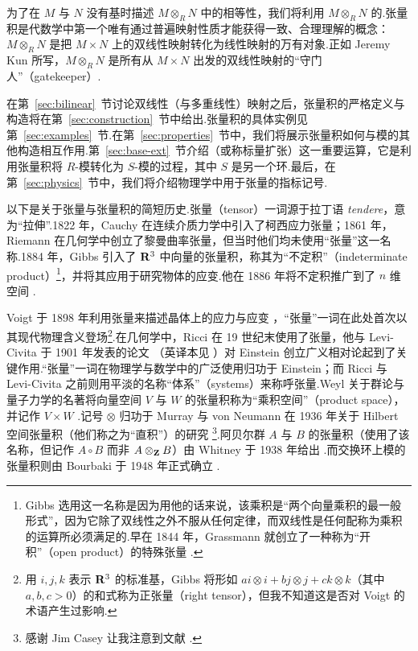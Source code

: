为了在 $M$ 与 $N$ 没有基时描述 $M \otimes_R N$ 中的相等性，我们将利用 $M \otimes_R N$ 的.张量积是代数学中第一个唯有通过普遍映射性质才能获得一致、合理理解的概念：$M \otimes_R N$ 是把 $M \times N$ 上的双线性映射转化为线性映射的万有对象.正如 Jeremy Kun \cite{kun} 所写，$M \otimes_R N$ 是所有从 $M \times N$ 出发的双线性映射的``守门人''（gatekeeper）.

在第~\ref{sec:bilinear}~节讨论双线性（与多重线性）映射之后，张量积的严格定义与构造将在第~\ref{sec:construction}~节中给出.张量积的具体实例见第~\ref{sec:examples}~节.在第~\ref{sec:properties}~节中，我们将展示张量积如何与模的其他构造相互作用.第~\ref{sec:base-ext}~节介绍（或称标量扩张）这一重要运算，它是利用张量积将 $R$-模转化为 $S$-模的过程，其中 $S$ 是另一个环.最后，在第~\ref{sec:physics}~节中，我们将介绍物理学中用于张量的指标记号.

以下是关于张量与张量积的简短历史.张量（tensor）一词源于拉丁语 \textit{tendere}，意为``拉伸''.1822 年，Cauchy 在连续介质力学中引入了柯西应力张量；1861 年，Riemann 在几何学中创立了黎曼曲率张量，但当时他们均未使用``张量''这一名称.1884 年，Gibbs \cite[第~3~章]{gibbs-vector} 引入了 $\mathbf{R}^3$ 中向量的张量积，称其为``不定积''（indeterminate product）\footnote{Gibbs 选用这一名称是因为用他的话来说，该乘积是``两个向量乘积的最一般形式''，因为它除了双线性之外不服从任何定律，而双线性是任何配称为乘积的运算所必须满足的.早在 1844 年，Grassmann 就创立了一种称为``开积''（open product）的特殊张量 \cite[第~3~章]{grassmann}.}，并将其应用于研究物体的应变.他在 1886 年将不定积推广到了 $n$ 维空间 \cite{gibbs-grassmann}.

Voigt 于 1898 年利用张量来描述晶体上的应力与应变 \cite{voigt}，``张量''一词在此处首次以其现代物理含义登场\footnote{用 $i, j, k$ 表示 $\mathbf{R}^3$ 的标准基，Gibbs 将形如 $a i \otimes i + b j \otimes j + c k \otimes k$（其中 $a, b, c > 0$）的和式称为正张量（right tensor）\cite[第~57~页]{gibbs-vector}，但我不知道这是否对 Voigt 的术语产生过影响.}.在几何学中，Ricci 在 19 世纪末使用了张量，他与 Levi-Civita 于 1901 年发表的论文 \cite{ricci-levicivita}（英译本见 \cite{ricci-english}）对 Einstein 创立广义相对论起到了关键作用.``张量''一词在物理学与数学中的广泛使用归功于 Einstein；而 Ricci 与 Levi-Civita 之前则用平淡的名称``体系''（systems）来称呼张量.Weyl 关于群论与量子力学的名著将向量空间 $V$ 与 $W$ 的张量积称为``乘积空间''（product space），并记作 $V \times W$ \cite[第~II~章第~10~节]{weyl-groups}.记号 $\otimes$ 归功于 Murray 与 von Neumann 在 1936 年关于 Hilbert 空间张量积（他们称之为``直积''）的研究 \cite[第~II~章]{murray-vonneumann}\footnote{感谢 Jim Casey 让我注意到文献 \cite{murray-vonneumann}.}.阿贝尔群 $A$ 与 $B$ 的张量积（使用了该名称，但记作 $A \circ B$ 而非 $A \otimes_{\mathbf{Z}} B$）由 Whitney 于 1938 年给出 \cite{whitney}.而交换环上模的张量积则由 Bourbaki 于 1948 年正式确立 \cite{bourbaki-alg}.
